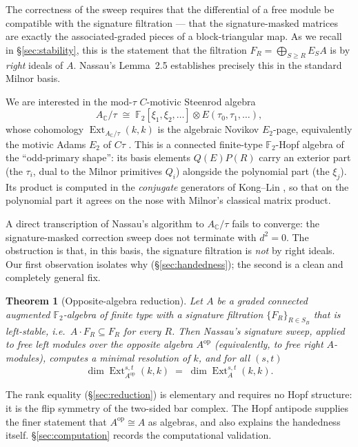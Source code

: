 \documentclass[11pt]{article}
\newtheorem{theorem}{Theorem}
\theoremstyle{definition}
\DeclareMathOperator{\Ext}{Ext}
\DeclareMathOperator{\op}{op}
\newcommand{\F}{\mathbb{F}}
\newcommand{\Actau}{A_{\mathbb C}/\tau}
\newcommand{\Aop}{A^{\op}}
\begin{document}
The correctness of the sweep requires that the differential of a free module be
compatible with the signature filtration --- that the signature-masked matrices are
exactly the associated-graded pieces of a block-triangular map. As we recall in
\S\ref{sec:stability}, this is the statement that the filtration
$F_R=\bigoplus_{S\ge R}E_SA$ is by \emph{right} ideals of $A$. Nassau's Lemma~2.5
establishes precisely this in the standard Milnor basis.

We are interested in the mod-$\tau$ $C$-motivic Steenrod algebra
\[
  \Actau \;\cong\; \F_2[\xi_1,\xi_2,\dots]\otimes E(\tau_0,\tau_1,\dots),
\]
whose cohomology $\Ext_{\Actau}(k,k)$ is the algebraic Novikov $E_2$-page,
equivalently the motivic Adams $E_2$ of $C\tau$ \cite{gwx}. This is a connected
finite-type $\F_2$-Hopf algebra of the ``odd-primary shape'': its basis elements
$Q(E)P(R)$ carry an exterior part (the $\tau_i$, dual to the Milnor primitives
$Q_i$) alongside the polynomial part (the $\xi_j$). Its product is computed in the
\emph{conjugate} generators of Kong--Lin \cite{konglin}, so that on the polynomial
part it agrees on the nose with Milnor's classical matrix product.

A direct transcription of Nassau's algorithm to $\Actau$ fails to converge: the
signature-masked correction sweep does not terminate with $d^2=0$. The obstruction
is that, in this basis, the signature filtration is \emph{not} by right ideals. Our
first observation isolates why (\S\ref{sec:handedness}); the second is a clean and
completely general fix.

\begin{theorem}[Opposite-algebra reduction]\label{thm:main}
Let $A$ be a graded connected augmented $\F_2$-algebra of finite type with a
signature filtration $\{F_R\}_{R\in S_B}$ that is \emph{left}-stable, i.e.\ $A\cdot
F_R\subseteq F_R$ for every $R$. Then Nassau's signature sweep, applied to free left
modules over the opposite algebra $\Aop$ (equivalently, to free \emph{right}
$A$-modules), computes a minimal resolution of $k$, and for all $(s,t)$
\[
  \dim\Ext^{s,t}_{\Aop}(k,k)\;=\;\dim\Ext^{s,t}_{A}(k,k).
\]
\end{theorem}

The rank equality (\S\ref{sec:reduction}) is elementary and requires no Hopf
structure: it is the flip symmetry of the two-sided bar complex. The Hopf antipode
supplies the finer statement that $\Aop\cong A$ as algebras, and also explains the
handedness itself. \S\ref{sec:computation} records the computational validation.
\end{document}
